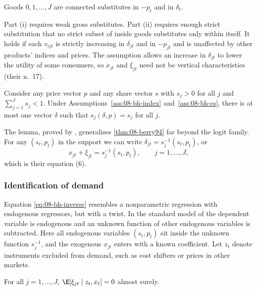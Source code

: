 \begin{assumption}\label{ass:08-bh-cs}
Goods $0, 1, \dots, J$ are connected substitutes in $-p_t$ and in $\delta_t$.
\end{assumption}

Part (i) requires weak gross substitutes. Part (ii) requires enough strict substitution that no strict subset of
inside goods substitutes only within itself. It holds if each $v_{ijt}$ is strictly increasing in $\delta_{jt}$
and in $-p_{jt}$ and is unaffected by other products' indices and prices. The assumption allows an increase in
$\delta_{jt}$ to lower the utility of some consumers, so $x_{jt}$ and $\xi_{jt}$ need not be vertical
characteristics (their n.~17).

\begin{lemma}\label{lem:08-bh-invert}
Consider any price vector $p$ and any share vector $s$ with $s_j > 0$ for all $j$ and $\sum_{j=1}^{J}s_j < 1$.
Under Assumptions~\ref{ass:08-bh-index} and~\ref{ass:08-bh-cs}, there is at most one vector $\delta$ such that $s_j(\delta, p) = s_j$
for all $j$.
\end{lemma}

The lemma, proved by \citet{BerryGandhiHaile2013}, generalizes \cref{thm:08-berry94} far beyond the logit
family. For any $(s_t, p_t)$ in the support we can write $\delta_{jt} = s_j^{-1}(s_t, p_t)$, or
\begin{equation}\label{eq:08-bh-inverse}
  x_{jt} + \xi_{jt} = s_j^{-1}(s_t, p_t), \qquad j = 1, \dots, J,
\end{equation}
which is their equation (6).

\subsubsection{Identification of demand}

Equation \eqref{eq:08-bh-inverse} resembles a nonparametric regression with endogenous regressors, but with a
twist. In the standard model of \citet{NeweyPowell2003} the dependent variable is endogenous and an unknown
function of other endogenous variables is subtracted. Here all endogenous variables $(s_t, p_t)$ sit inside the
unknown function $s_j^{-1}$, and the exogenous $x_{jt}$ enters with a known coefficient. Let $z_t$ denote
instruments excluded from demand, such as cost shifters or prices in other markets.

\begin{assumption}\label{ass:08-bh-excl}
For all $j = 1, \dots, J$, $\E[\xi_{jt} \mid z_t, x_t] = 0$ almost surely.
\end{assumption}

